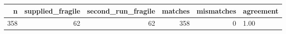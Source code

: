 \begin{tabular}{rrrrrl}
\toprule
n & supplied\_fragile & second\_run\_fragile & matches & mismatches & agreement \\
\midrule
358 & 62 & 62 & 358 & 0 & 1.00 \\
\bottomrule
\end{tabular}
